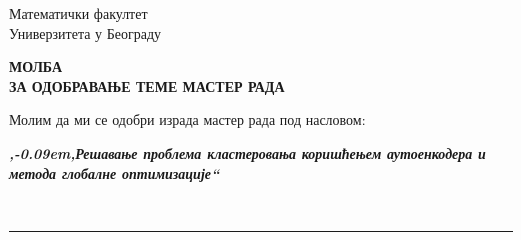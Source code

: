 \documentclass[a4paper]{article}
\def\zn{,\kern-0.09em,}
\begin{document}
\thispagestyle{empty}

\begin{flushleft}
Математички факултет\\
Универзитета у Београду
\end{flushleft}

\bigskip

\begin{center}
\textbf{МОЛБА\\
ЗА ОДОБРАВАЊЕ ТЕМЕ МАСТЕР РАДА
}\end{center}

\bigskip

\begin{flushleft}
Молим да ми се одобри израда мастер рада под насловом:
\end{flushleft}

\begin{minipage}{17.5cm}
\textbf{\textit{\zn Решавање проблема кластеровања коришћењем аутоенкодера и метода глобалне оптимизације``}}
\end{minipage}\\
\rule[4mm]{17.5cm}{.05mm}
\end{document}
